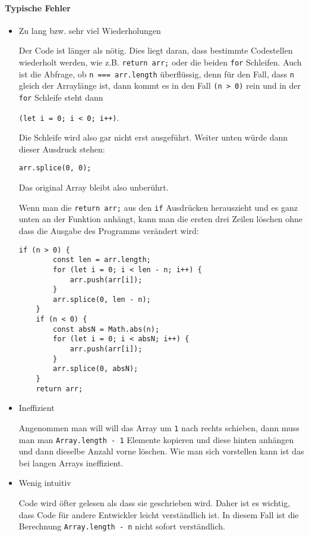 \documentclass{book}
\begin{document}
\paragraph{Typische Fehler}
\begin{itemize} 
	\item Zu lang bzw. sehr viel Wiederholungen
	
	Der Code ist länger als nötig. Dies liegt daran, dass bestimmte Codestellen wiederholt werden, wie z.B. \lstinline|return arr;| oder die beiden \lstinline|for| Schleifen. Auch ist die Abfrage, ob \lstinline|n === arr.length| überflüssig, denn für den Fall, dass \lstinline|n| gleich der Arraylänge ist, dann kommt es in den Fall \lstinline|(n > 0)| rein und in der \lstinline|for| Schleife steht dann
	
	\lstinline|(let i = 0; i < 0; i++)|. 
	
	Die Schleife wird also gar nicht erst ausgeführt. Weiter unten würde dann dieser Ausdruck stehen: 
	
	\lstinline|arr.splice(0, 0);|
	
	Das original Array bleibt also unberührt.
	
	Wenn man die \lstinline|return arr;| aus den \lstinline|if| Ausdrücken herauszieht und es ganz unten an der Funktion anhängt, kann man die ersten drei Zeilen löschen ohne dass die Ausgabe des Programms verändert wird:
	
	\begin{lstlisting}[caption=My Javascript Example]
	if (n > 0) {
		const len = arr.length;
		for (let i = 0; i < len - n; i++) {
			arr.push(arr[i]);
		}
		arr.splice(0, len - n);
	}
	if (n < 0) {
		const absN = Math.abs(n);
		for (let i = 0; i < absN; i++) {
			arr.push(arr[i]);
		}
		arr.splice(0, absN);
	}
	return arr;
	\end{lstlisting} 
	
	\item Ineffizient
	
	Angenommen man will will das Array um \lstinline|1| nach rechts schieben, dann muss man man \lstinline|Array.length - 1| Elemente kopieren und diese hinten anhängen und dann dieselbe Anzahl vorne löschen. Wie man sich vorstellen kann ist das bei langen Arrays ineffizient.
	
	\item Wenig intuitiv
	
	Code wird öfter gelesen als dass sie geschrieben wird. Daher ist es wichtig, dass Code für andere Entwickler leicht verständlich ist. In diesem Fall ist die Berechnung \lstinline|Array.length - n| nicht sofort verständlich.
	 
\end{itemize}
\end{document}
